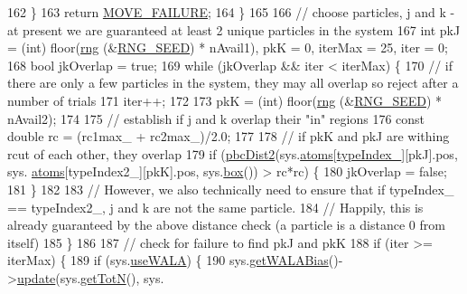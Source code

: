\begin{DoxyCode}
162             \}
163             \textcolor{keywordflow}{return} \hyperlink{moves_8h_a9832cf5fcfa8c0894545b591c9908e39}{MOVE\_FAILURE};
164         \}
165 
166         \textcolor{comment}{// choose particles, j and k - at present we are guaranteed at least 2 unique particles in the
       system}
167         \textcolor{keywordtype}{int} pkJ = (int) floor(\hyperlink{utilities_8cpp_a0f9542af4b475ac79cb679d7a8d14db0}{rng} (&\hyperlink{global_8h_a3f4e4ea24d5a5c66feae55d1f329c884}{RNG\_SEED}) * nAvail1), pkK = 0, iterMax = 25, iter = 0;
168         \textcolor{keywordtype}{bool} jkOverlap = \textcolor{keyword}{true};
169         \textcolor{keywordflow}{while} (jkOverlap && iter < iterMax) \{
170             \textcolor{comment}{// if there are only a few particles in the system, they may all overlap so reject after a
       number of trials}
171             iter++;
172 
173             pkK = (int) floor(\hyperlink{utilities_8cpp_a0f9542af4b475ac79cb679d7a8d14db0}{rng} (&\hyperlink{global_8h_a3f4e4ea24d5a5c66feae55d1f329c884}{RNG\_SEED}) * nAvail2);
174 
175             \textcolor{comment}{// establish if j and k overlap their "in" regions}
176             \textcolor{keyword}{const} \textcolor{keywordtype}{double} rc = (rc1max\_ + rc2max\_)/2.0;
177 
178             \textcolor{comment}{// if pkK and pkJ are withing rcut of each other, they overlap}
179             \textcolor{keywordflow}{if} (\hyperlink{utilities_8cpp_abb1db3a8a3ac46e044bbe7b2c5684c0a}{pbcDist2}(sys.\hyperlink{classsim_system_a90421b19082f7fb8fc23b7264b1161e4}{atoms}[\hyperlink{classmc_move_acb731965547b0326ef318ec96da8b46a}{typeIndex\_}][pkJ].pos, sys.
      \hyperlink{classsim_system_a90421b19082f7fb8fc23b7264b1161e4}{atoms}[typeIndex2\_][pkK].pos, sys.\hyperlink{classsim_system_a8bff9dfb95b1b09a0fab2c1c485ade07}{box}()) > rc*rc) \{
180                     jkOverlap = \textcolor{keyword}{false};
181             \}
182 
183             \textcolor{comment}{// However, we also technically need to ensure that if typeIndex\_ == typeIndex2\_, j and k are
       not the same particle.}
184             \textcolor{comment}{// Happily, this is already guaranteed by the above distance check (a particle is a distance 0
       from itself)}
185         \}
186 
187         \textcolor{comment}{// check for failure to find pkJ and pkK}
188         \textcolor{keywordflow}{if} (iter >= iterMax) \{
189             \textcolor{keywordflow}{if} (sys.\hyperlink{classsim_system_aa83b00006b3919fb6e13f1bdeadece6a}{useWALA}) \{
190                     sys.\hyperlink{classsim_system_a7cb5049de8b0988349e89e30e4000407}{getWALABias}()->\hyperlink{classwala_ab439e3f60bea6c54522a870b9ad67acf}{update}(sys.\hyperlink{classsim_system_a37dd827f4057049763351510147b9f1d}{getTotN}(), sys.

\end{DoxyCode}
